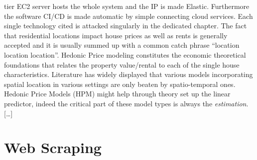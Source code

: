 \documentclass[
  12pt,
  a4paper,
  oneside]{book}
\theoremstyle{definition}
\theoremstyle{definition}
\theoremstyle{definition}
\theoremstyle{remark}
\begin{document}
tier EC2 server hosts the whole system and the IP is made Elastic. Furthermore the software CI/CD is made automatic by simple connecting cloud services. Each single technology cited is attacked singularly in the dedicated chapter.
The fact that residential locations impact house prices as well as rents is generally accepted and it is usually summed up with a common catch phrase ``location location location''. Hedonic Price modeling constitutes the economic theoretical foundations that relates the property value/rental to each of the single house characteristics. Literature has widely displayed that various models incorporating spatial location in various settings are only beaten by spatio-temporal ones.
Hedonic Price Models (HPM) might help through theory set up the linear predictor, indeed the critical part of these model types is always the \emph{estimation}. {[}\ldots{]}

\hypertarget{scraping}{%
\chapter{Web Scraping}\label{scraping}}
\end{document}

